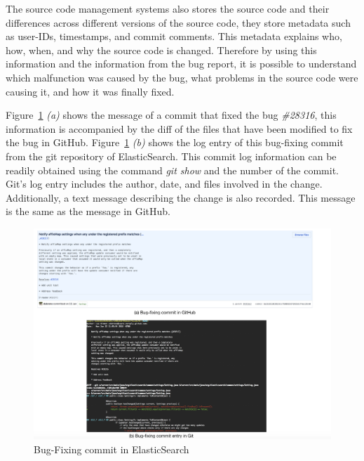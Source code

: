\documentclass[a4paper, 12pt]{book}
\begin{document}
The source code management systems also stores the source code and their differences across different versions of the source code, they store metadata such as user-IDs, timestamps, and commit comments. This metadata explains who, how, when, and why the source code is changed. Therefore by using this information and the information from the bug report, it is possible to understand which malfunction was caused by the bug, what problems in the source code were causing it, and how it was finally fixed.

Figure~\ref{fig:bugfix} \emph{(a)} shows the message of a commit that fixed the bug \emph{\#28316}, this information is accompanied by the diff of the files that have been modified to fix the bug in GitHub. Figure~\ref{fig:bugfix} \emph{(b)} shows the log entry of this bug-fixing commit from the git repository of ElasticSearch. This commit log information can be readily obtained using the command \emph{git show} and the number of the commit. Git's log entry includes the author, date, and files involved in the change. Additionally, a text message describing the change is also recorded. This message is the same as the message in GitHub. %

\begin{figure}[ht]
\centering
\includegraphics[width=\columnwidth]{img/bugfix.png}
\caption{Bug-Fixing commit in ElasticSearch}
\label{fig:bugfix}       %
\end{figure}
\end{document}
